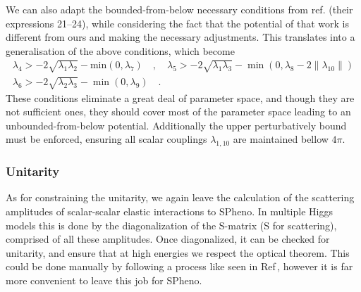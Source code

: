 We can also adapt the bounded-from-below necessary conditions from ref. \cite{Moretti_2015} (their expressions 21–24), while considering the fact that the potential of that work is different from ours and making the necessary adjustments.
%
This translates into a generalisation of the above conditions, which become
%
\begin{equation}
\begin{gathered}
\lambda_4 > - 2 \sqrt{\lambda_1 \lambda_2} - \text{min}(0,\lambda_7) \quad , \quad  \lambda_5 > -2 \sqrt{\lambda_1 \lambda_3} - \min(0,\lambda_8 - 2\|\lambda_{10}\|)  \\
\lambda_6 > - 2 \sqrt{\lambda_2 \lambda_3} - \min(0,\lambda_9) \quad . 
\end{gathered} 
\end{equation}
%
These conditions eliminate a great deal of parameter space, and though they are not sufficient ones, they should cover most of the parameter space leading to an unbounded-from-below potential.
% 
Additionally the upper perturbatively bound must be enforced, ensuring all scalar couplings $\lambda_{1,10}$ are maintained bellow $4\pi$.

\subsubsection{Unitarity}

As for constraining the unitarity, we again leave the calculation of the scattering amplitudes of scalar-scalar elastic interactions to SPheno. 
%
In multiple Higgs models this is done by the diagonalization of the S-matrix (S for scattering), comprised of all these amplitudes.
%
Once diagonalized, it can be checked for unitarity, and ensure that at high energies we respect the optical theorem.  
%
This could be done manually by following a process like seen in Ref\,\cite{Moretti_2015}, however it is far more convenient to leave this job for SPheno. 

% 

%

